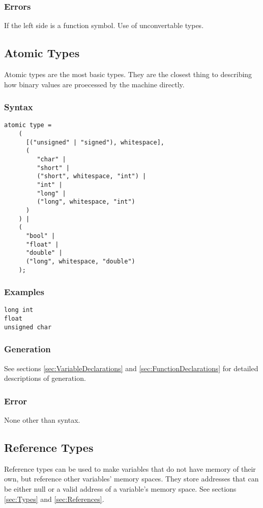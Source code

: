 \documentclass[10pt,a4paper]{article}
\begin{document}
\subsubsection{Errors}
If the left side is a function symbol. Use of unconvertable types.

\newpage





\subsection{Atomic Types}
\label{sec:AtomicTypes}
Atomic types are the most basic types. They are the closest thing to describing how binary values are proecessed by the machine directly.

\subsubsection{Syntax}
\begin{verbatim}
atomic type =
    (
      [("unsigned" | "signed"), whitespace],
      (
         "char" |
         "short" |
         ("short", whitespace, "int") |
         "int" |
         "long" |
         ("long", whitespace, "int")
      )
    ) |
    (
      "bool" |
      "float" |
      "double" |
      ("long", whitespace, "double")
    );
\end{verbatim}

\subsubsection{Examples}
\begin{verbatim}
long int
float
unsigned char
\end{verbatim}

\subsubsection{Generation}
See sections \ref{sec:VariableDeclarations} and \ref{sec:FunctionDeclarations} for detailed descriptions of generation.

\subsubsection{Error}
None other than syntax.

\newpage




\subsection{Reference Types}
\label{sec:AtomicTypes}
Reference types can be used to make variables that do not have memory of their own, but reference other variables' memory spaces. They store addresses that can be either null or a valid address of a variable's memory space. See sections \ref{sec:Types} and \ref{sec:References}.
\end{document}

